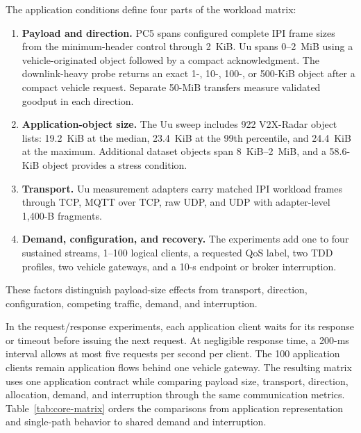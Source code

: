 The application conditions define four parts of the workload matrix:
\begin{enumerate}
  \renewcommand{\labelenumi}{\arabic{enumi})}
  \item \textbf{Payload and direction.} PC5 spans configured complete IPI
  frame sizes from the minimum-header control through 2~KiB. Uu spans
  0--2~MiB using a vehicle-originated object followed by a compact
  acknowledgment. The downlink-heavy probe returns an exact 1-, 10-, 100-, or
  500-KiB object after a compact vehicle request. Separate 50-MiB transfers
  measure validated goodput in each direction.
  \item \textbf{Application-object size.} The Uu sweep includes 922 V2X-Radar
  object lists: 19.2~KiB at the median, 23.4~KiB at the 99th percentile, and
  24.4~KiB at the maximum. Additional dataset objects span 8~KiB--2~MiB, and a
  58.6-KiB object provides a stress condition.
  \item \textbf{Transport.} Uu measurement adapters carry matched IPI workload
  frames through TCP, MQTT over TCP, raw UDP, and UDP with adapter-level
  1,400-B fragments.
  \item \textbf{Demand, configuration, and recovery.} The experiments add one
  to four sustained streams, 1--100 logical clients, a requested QoS label,
  two TDD profiles, two vehicle gateways, and a 10-s
  endpoint or broker interruption.
\end{enumerate}
These factors distinguish payload-size effects from transport, direction,
configuration, competing traffic, demand, and interruption.

In the request/response experiments, each application client waits for its
response or timeout before issuing the
next request. At negligible response time, a 200-ms interval allows at most
five requests per second per client. The 100 application clients remain
application flows behind one vehicle gateway. The resulting matrix uses one
application contract while comparing payload size, transport, direction,
allocation, demand, and interruption through the same communication metrics.
Table~\ref{tab:core-matrix} orders the comparisons from application
representation and single-path behavior to shared demand and interruption.

